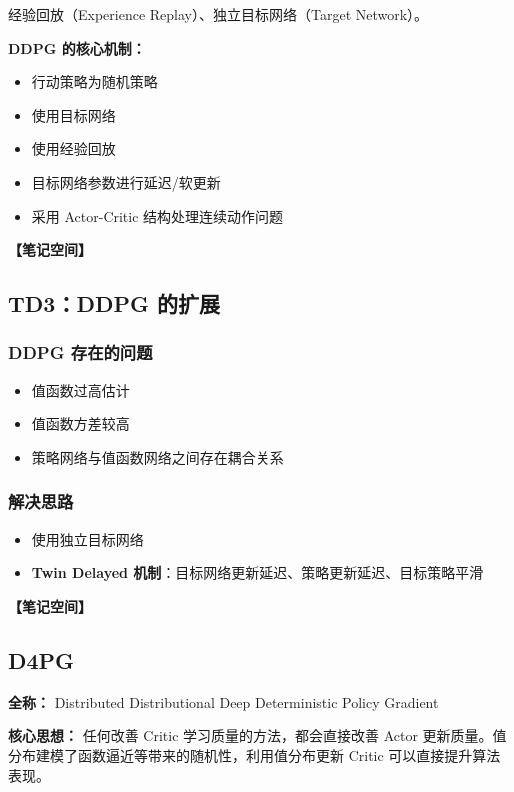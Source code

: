 \documentclass[12pt,a4paper]{article}
\newcommand{\notespace}[1][3cm]{%
  \vspace{#1}%
  \noindent\textbf{【笔记空间】}%
  \vspace{#1}%
}
\newcommand{\1}{\mathbf{1}}
\begin{document}
经验回放（Experience Replay）、独立目标网络（Target Network）。

\begin{keybox}
\textbf{DDPG 的核心机制：}
\begin{itemize}[leftmargin=1.5em]
  \item 行动策略为随机策略
  \item 使用目标网络
  \item 使用经验回放
  \item 目标网络参数进行延迟/软更新
  \item 采用 Actor-Critic 结构处理连续动作问题
\end{itemize}
\end{keybox}

\notespace[2cm]

\subsection{TD3：DDPG 的扩展}

\subsubsection*{DDPG 存在的问题}

\begin{itemize}[leftmargin=2em]
  \item 值函数过高估计
  \item 值函数方差较高
  \item 策略网络与值函数网络之间存在耦合关系
\end{itemize}

\subsubsection*{解决思路}

\begin{itemize}[leftmargin=2em]
  \item 使用独立目标网络
  \item \textbf{Twin Delayed 机制}：目标网络更新延迟、策略更新延迟、目标策略平滑
\end{itemize}

\notespace[2cm]

\subsection{D4PG}

\begin{notebox}
\textbf{全称：} Distributed Distributional Deep Deterministic Policy Gradient

\textbf{核心思想：} 任何改善 Critic 学习质量的方法，都会直接改善 Actor 更新质量。值分布建模了函数逼近等带来的随机性，利用值分布更新 Critic 可以直接提升算法表现。
\end{notebox}
\end{document}
